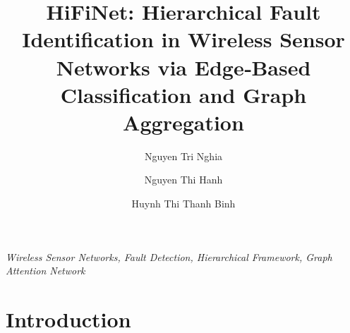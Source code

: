 \documentclass[preprint,12pt]{elsarticle}
\begin{document}
\begin{frontmatter}

\title{HiFiNet: Hierarchical Fault Identification in Wireless Sensor Networks via Edge‑Based Classification and Graph Aggregation}

\author[hust]{Nguyen Tri Nghia}
\author[pnk]{Nguyen Thi Hanh}
\author[hust]{Huynh Thi Thanh Binh}
\address[hust]{Hanoi University of Science and Technology, Vietnam}
\address[pnk]{Faculty of Interdisciplinary Digital Technology (FIDT), PHENIKAA University, Vietnam}



\begin{keyword}
\textit{Wireless Sensor Networks, Fault Detection, Hierarchical Framework, Graph Attention Network}
\end{keyword}

\end{frontmatter}
\section{Introduction}




\end{document}
